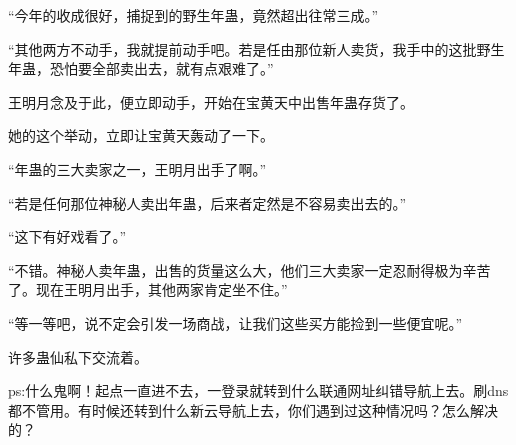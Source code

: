 \begin{this_body}
“今年的收成很好，捕捉到的野生年蛊，竟然超出往常三成。”

“其他两方不动手，我就提前动手吧。若是任由那位新人卖货，我手中的这批野生年蛊，恐怕要全部卖出去，就有点艰难了。”

王明月念及于此，便立即动手，开始在宝黄天中出售年蛊存货了。

她的这个举动，立即让宝黄天轰动了一下。

“年蛊的三大卖家之一，王明月出手了啊。”

“若是任何那位神秘人卖出年蛊，后来者定然是不容易卖出去的。”

“这下有好戏看了。”

“不错。神秘人卖年蛊，出售的货量这么大，他们三大卖家一定忍耐得极为辛苦了。现在王明月出手，其他两家肯定坐不住。”

“等一等吧，说不定会引发一场商战，让我们这些买方能捡到一些便宜呢。”

许多蛊仙私下交流着。

ps:什么鬼啊！起点一直进不去，一登录就转到什么联通网址纠错导航上去。刷dns都不管用。有时候还转到什么新云导航上去，你们遇到过这种情况吗？怎么解决的？

\end{this_body}

